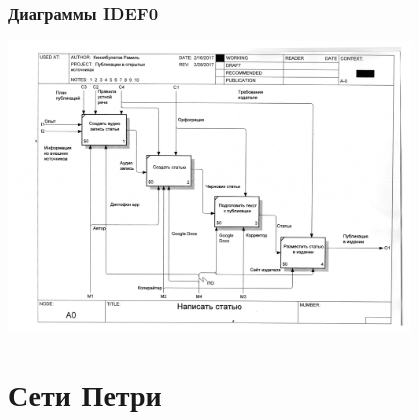 \documentclass{../mcsslides}
\begin{document}
    \begin{frame}
        \frametitle{Диаграммы IDEF0}
        \begin{center}
            \includegraphics[width=0.80\textwidth]{idef0.png}
        \end{center}
    \end{frame}

    \section{Сети Петри}
\end{document}
